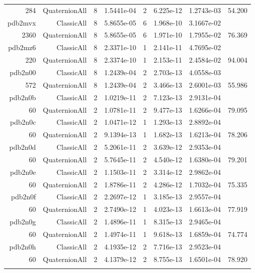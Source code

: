 \begin{xltabular}{\textwidth}{r|rcS[table-format=1.4e+2]cS[table-format=1.3e+2]S[table-format=1.4e+2]S[table-format=-1.3]}
284 & QuaternionAll & 8 & 1.5441e-04 & 2 & 6.225e-12 & 1.2743e-03 & 54.200\\  \addlinespace
pdb2mvx & ClassicAll & 8 & 5.8655e-05 & 6 & 1.968e-10 & 3.1667e-02 & \\
2360 & QuaternionAll & 8 & 5.8655e-05 & 6 & 1.971e-10 & 1.7955e-02 & 76.369\\  \addlinespace
pdb2mz6 & ClassicAll & 8 & 2.3371e-10 & 1 & 2.141e-11 & 4.7695e-02 & \\
220 & QuaternionAll & 8 & 2.3374e-10 & 1 & 2.153e-11 & 2.4584e-02 & 94.004\\  \addlinespace
pdb2n00 & ClassicAll & 8 & 1.2439e-04 & 2 & 2.703e-13 & 4.0558e-03 & \\
572 & QuaternionAll & 8 & 1.2439e-04 & 2 & 3.466e-13 & 2.6001e-03 & 55.986\\  \addlinespace
pdb2n0b & ClassicAll & 2 & 1.0219e-11 & 2 & 7.123e-13 & 2.9131e-04 & \\
60 & QuaternionAll & 2 & 1.0781e-11 & 2 & 9.477e-13 & 1.6266e-04 & 79.095\\  \addlinespace
pdb2n0c & ClassicAll & 2 & 1.0471e-12 & 1 & 1.293e-13 & 2.8892e-04 & \\
60 & QuaternionAll & 2 & 9.1394e-13 & 1 & 1.682e-13 & 1.6213e-04 & 78.206\\  \addlinespace
pdb2n0d & ClassicAll & 2 & 5.2061e-11 & 2 & 3.639e-12 & 2.9353e-04 & \\
60 & QuaternionAll & 2 & 5.7645e-11 & 2 & 4.540e-12 & 1.6380e-04 & 79.201\\  \addlinespace
pdb2n0e & ClassicAll & 2 & 1.1503e-11 & 2 & 3.314e-12 & 2.9862e-04 & \\
60 & QuaternionAll & 2 & 1.8786e-11 & 2 & 4.286e-12 & 1.7032e-04 & 75.335\\  \addlinespace
pdb2n0f & ClassicAll & 2 & 2.2697e-12 & 1 & 3.185e-13 & 2.9557e-04 & \\
60 & QuaternionAll & 2 & 2.7490e-12 & 1 & 4.023e-13 & 1.6613e-04 & 77.919\\  \addlinespace
pdb2n0g & ClassicAll & 2 & 1.4896e-11 & 1 & 8.315e-13 & 2.9465e-04 & \\
60 & QuaternionAll & 2 & 1.4974e-11 & 1 & 9.618e-13 & 1.6859e-04 & 74.774\\  \addlinespace
pdb2n0h & ClassicAll & 2 & 4.1935e-12 & 2 & 7.716e-13 & 2.9523e-04 & \\
60 & QuaternionAll & 2 & 4.1379e-12 & 2 & 8.755e-13 & 1.6501e-04 & 78.920\\  \addlinespace

\end{xltabular}
